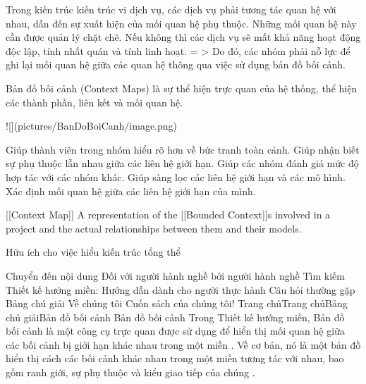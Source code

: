 
Trong kiến trúc kiến trúc vi dịch vụ, các dịch vụ phải tương tác quan hệ với nhau, dẫn đến sự xuất hiện của mối quan hệ phụ thuộc. Những mối quan hệ này cần được quản lý chặt chẽ. Nếu không thì các dịch vụ sẽ mất khả năng hoạt động độc lập, tính nhất quán và tính linh hoạt.
= > Do đó, các nhóm phải nỗ lực để ghi lại mối quan hệ giữa các quan hệ thông qua việc sử dụng bản đồ bối cảnh.

Bản đồ bối cảnh (Context Maps) là sự thể hiện trực quan của hệ thống, thể hiện các thành phần, liên kết và mối quan hệ.

![](pictures/BanDoBoiCanh/image.png)


Giúp thành viên trong nhóm hiểu rõ hơn về bức tranh toàn cảnh.
Giúp nhận biết sự phụ thuộc lẫn nhau giữa các liên hệ giới hạn.
Giúp các nhóm đánh giá mức độ hợp tác với các nhóm khác.
Giúp sàng lọc các liên hệ giới hạn và các mô hình.
Xác định mối quan hệ giữa các liên hệ giới hạn của mình.






[[Context Map]] A representation of the [[Bounded Context]]s involved in a project and the actual relationships between them and their models.

Hữu ích cho việc hiểu kiến ​​trúc tổng thể





Chuyển đến nội dung
Đối với người hành nghề bởi người hành nghề
Tìm kiếm
Thiết kế hướng miền: Hướng dẫn dành cho người thực hành
Câu hỏi thường gặp
Bảng chú giải
Về chúng tôi
Cuốn sách của chúng tôi!
Trang chủTrang chủBảng chú giảiBản đồ bối cảnh
Bản đồ bối cảnh
Trong Thiết kế hướng miền, Bản đồ bối cảnh là một công cụ trực quan được sử dụng để hiển thị mối quan hệ giữa các bối cảnh bị giới hạn khác nhau trong một miền . Về cơ bản, nó là một bản đồ hiển thị cách các bối cảnh khác nhau trong một miền tương tác với nhau, bao gồm ranh giới, sự phụ thuộc và kiểu giao tiếp của chúng .


